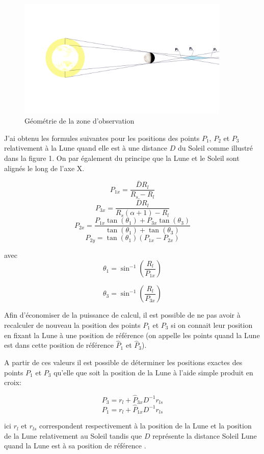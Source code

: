 \documentclass[11pt]{article} %
\begin{document}
		\begin{figure}[H]
			\includegraphics[width=0.9\textwidth]{images/moon_schem.png}
			\caption{Géométrie de la zone d'observation}
		\end{figure}
		
		J'ai obtenu les formules suivantes pour les positions des points $P_1$, $P_2$ et $P_3$ relativement à la Lune quand elle est à une distance $D$ du Soleil comme illustré dans la figure 1. On par également du principe que la Lune et le Soleil sont alignés le long de l'axe X.
		
		$$	
		P_{1x}=\frac{\bar{D}R_l}{R_s-R_l}
		$$ 
		$$	
		P_{3x}=\frac{\bar{D}R_l}{R_s(\alpha+1)-R_l}
		$$
		$$
		P_{2x}=\frac{P_{1x}\tan(\theta_1) + P_{3x}\tan(\theta_3)}{\tan(\theta_1) + \tan(\theta_3)}
		$$
		$$
		P_{2y}=\tan(\theta_1)(P_{1x}-P_{2x})
		$$
		
		avec
		$$
		\theta_1=\sin^{-1}\left(\frac{R_l}{P_{1x}}\right)
		$$
		
		$$
		\theta_3=\sin^{-1}\left(\frac{R_l}{P_{3x}}\right)
		$$
		
		Afin d'économiser de la puissance de calcul, il est possible de ne pas avoir à recalculer de nouveau la position des points $P_1$ et $P_3$ si on connait leur position en fixant la Lune à une position de référence (on appelle les points quand la Lune est dans cette position de référence $\hat{P}_1$ et $\hat{P}_3$). 
		
		A partir de ces valeurs il est possible de déterminer les positions exactes des points $P_1$ et $P_3$ qu'elle que soit la position de la Lune à l'aide simple produit en croix:
		
		$$
			P_3=r_{l}+\hat{P}_{3x}D^{-1}r_{ls} 
		$$
		$$
			P_1=r_{l}+\hat{P}_{1x}D^{-1}r_{ls}
		$$
		
		ici $r_{l}$ et $r_{ls}$ correspondent respectivement à la position de la Lune et la position de la Lune relativement au Soleil tandis que $D$ représente la distance Soleil Lune quand la Lune est à sa position de référence .
		
\end{document}
